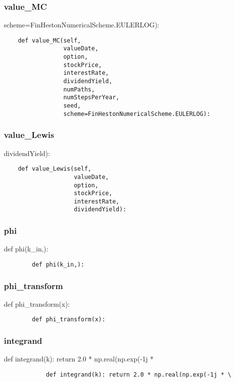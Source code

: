 \documentclass[twoside,11pt]{book}
\begin{document}
\subsubsection*{{\bf value\_MC}}
scheme=FinHestonNumericalScheme.EULERLOG): 

\begin{lstlisting}
    def value_MC(self,
                 valueDate,
                 option,
                 stockPrice,
                 interestRate,
                 dividendYield,
                 numPaths,
                 numStepsPerYear,
                 seed,
                 scheme=FinHestonNumericalScheme.EULERLOG):
\end{lstlisting}

\subsubsection*{{\bf value\_Lewis}}
dividendYield): 

\begin{lstlisting}
    def value_Lewis(self,
                    valueDate,
                    option,
                    stockPrice,
                    interestRate,
                    dividendYield):
\end{lstlisting}

\subsubsection*{{\bf phi}}
def phi(k\_in,): 

\begin{lstlisting}
        def phi(k_in,):
\end{lstlisting}

\subsubsection*{{\bf phi\_transform}}
def phi\_transform(x): 

\begin{lstlisting}
        def phi_transform(x):
\end{lstlisting}

\subsubsection*{{\bf integrand}}
def integrand(k): return 2.0 * np.real(np.exp(-1j * \ 

\begin{lstlisting}
            def integrand(k): return 2.0 * np.real(np.exp(-1j * \
\end{lstlisting}
\end{document}
